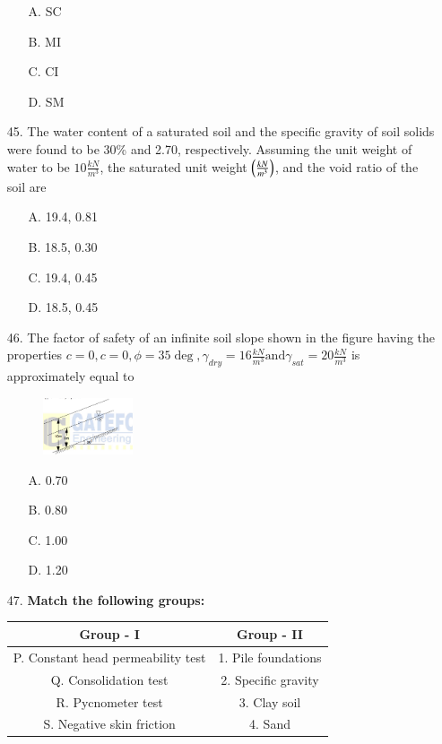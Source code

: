 \documentclass[journal]{IEEEtran}
\begin{document}
\begin{enumerate}
\begin{enumerate}
    \item [A.] SC
    \item [B.] MI
    \item [C.] CI
    \item [D.] SM
  \end{enumerate}
  \item[45.] The water content of a saturated soil and the specific gravity of soil solids were
  found to be 30\% and 2.70, respectively. Assuming the unit weight of water to be
  $10\frac{kN}{m^3}$, the saturated unit weight $\left(\frac{kN}{m^3}\right)$, and the void ratio of the soil are 
  \begin{enumerate}
    \item [A.] 19.4, 0.81
    \item [B.] 18.5, 0.30
    \item [C.] 19.4, 0.45
    \item [D.] 18.5, 0.45
  \end{enumerate}
  \item [46.] The factor of safety of an infinite soil slope shown in the figure having the
  properties $c=0, c=0,\phi=35\deg,\gamma_{dry}=16\frac{kN}{m^3} \text{and} \gamma_{sat}=20\frac{kN}{m^3}$ is
  approximately equal to
  \begin{figure}[h!]
    \centering
    \includegraphics[width=0.25\textwidth]{figs/Fig_6.png}  %
    \label{fig:sample6}
\end{figure}
  \begin{enumerate}
    \item [A.] 0.70
    \item [B.] 0.80
    \item [C.] 1.00
    \item [D.] 1.20
  \end{enumerate} 
  \item [47.] \textbf{Match the following groups:}

  \begin{center}
  \begin{tabular}{|c c|}
  \hline
  \textbf{Group - I} & \textbf{Group - II} \\
  \hline
  P. Constant head permeability test & 1. Pile foundations \\
  Q. Consolidation test               & 2. Specific gravity \\
  R. Pycnometer test                  & 3. Clay soil \\
  S. Negative skin friction            & 4. Sand \\
  \hline
  \end{tabular}
  \end{center}
  

\end{enumerate}
\end{document}
